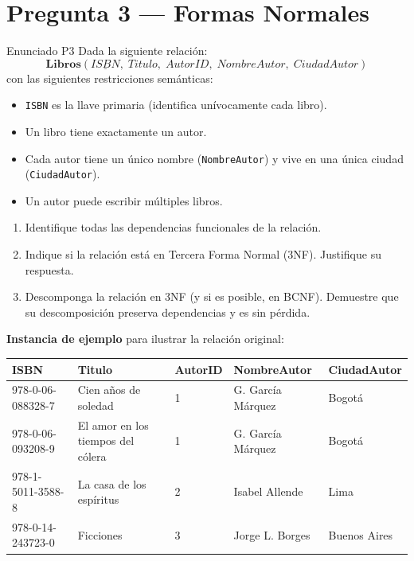 \documentclass[12pt,a4paper]{article}
\begin{document}
\newpage

\section*{Pregunta 3 --- Formas Normales}

\begin{enunciadobox}{Enunciado P3}
Dada la siguiente relación:
\[
  \textbf{Libros}(\underline{ISBN},\; Titulo,\; AutorID,\;
  NombreAutor,\; CiudadAutor)
\]
con las siguientes restricciones semánticas:
\begin{itemize}[leftmargin=2em,itemsep=2pt]
  \item \texttt{ISBN} es la llave primaria (identifica unívocamente cada libro).
  \item Un libro tiene exactamente un autor.
  \item Cada autor tiene un único nombre (\texttt{NombreAutor}) y
        vive en una única ciudad (\texttt{CiudadAutor}).
  \item Un autor puede escribir múltiples libros.
\end{itemize}

\begin{enumerate}[leftmargin=2em]
  \item[\textbf{P3.1}] Identifique todas las dependencias funcionales de la relación.
  \item[\textbf{P3.2}] Indique si la relación está en Tercera Forma Normal (3NF).
        Justifique su respuesta.
  \item[\textbf{P3.3}] Descomponga la relación en 3NF (y si es posible, en BCNF).
        Demuestre que su descomposición preserva dependencias y es sin pérdida.
\end{enumerate}
\end{enunciadobox}

\vspace{0.5cm}

\textbf{Instancia de ejemplo} para ilustrar la relación original:

\begin{center}
\begin{tabular}{lllll}
  \toprule
  \textbf{ISBN} & \textbf{Titulo} & \textbf{AutorID} & \textbf{NombreAutor} & \textbf{CiudadAutor} \\
  \midrule
  978-0-06-088328-7 & Cien años de soledad            & 1 & G. García Márquez & Bogotá       \\
  978-0-06-093208-9 & El amor en los tiempos del cólera & 1 & G. García Márquez & Bogotá     \\
  978-1-5011-3588-8 & La casa de los espíritus        & 2 & Isabel Allende    & Lima         \\
  978-0-14-243723-0 & Ficciones                       & 3 & Jorge L. Borges   & Buenos Aires \\
  \bottomrule
\end{tabular}
\end{center}
\end{document}
